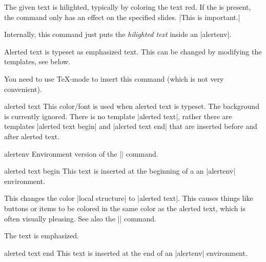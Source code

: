\begin{command}{\alert{}}
  The given text is hilighted, typically by coloring the text red. If
  the  is present, the command only has an
  effect on the specified slides.
  \example |This is \alert{important}.|

  Internally, this command just puts the \emph{hilighted text} inside
  an |alertenv|.

  \articlenote
  Alerted text is typeset as emphasized text. This can be changed by
  modifying the templates, see below.

  \lyxnote
  You need to use \TeX-mode to insert this command (which is not very
  convenient).

  \begin{element}{alerted text}\no\yes\yes
    This color/font is used when alerted text is typeset. The
    background is currently ignored. There is no template
    |alerted text|, rather there are templates |alerted text begin|
    and |alerted text end| that are inserted before and after alerted
    text.
  \end{element}
\end{command}

\begin{environment}{{alertenv}}
  Environment version of the |\alert| command.

  \begin{element}{alerted text begin}\yes\no\no
    This text is inserted at the beginning of a an |alertenv|
    environment.

    \begin{templateoptions}

      \beamernote
      This changes the color |local structure| to |alerted text|. This
      causes things like buttons or items to be colored in the same
      color as the alerted text, which is often visually pleasing. See
      also the |\structure| command.

      \articlenote
      The text is emphasized.
    \end{templateoptions}
  \end{element}

  \begin{element}{alerted text end}\yes\no\no
    This text is inserted at the end of an |alertenv| environment.
  \end{element}
\end{environment}




